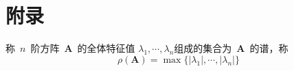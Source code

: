 
\chapter*{附\quad 录}


 \begin{lemma}[谱半径]\label{lem:lem1}
  称~$n$~阶方阵~$\mathbf{A}$~的全体特征值
  $\lambda_1,\cdots,\lambda_n$组成的集合为~$\mathbf{A}$~的谱，称
  $$\rho(\mathbf{A})=\max{\{|\lambda_1|,\cdots,|\lambda_n|\}}$$
\end{lemma}


